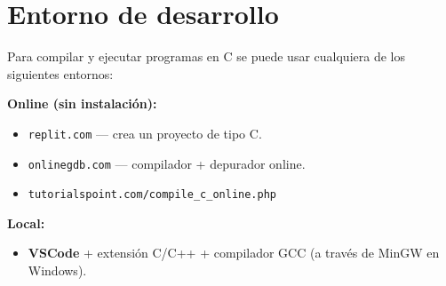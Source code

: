 \section{Entorno de desarrollo}

Para compilar y ejecutar programas en C se puede usar cualquiera de los siguientes entornos:

\textbf{Online (sin instalación):}
\begin{itemize}
    \item \texttt{replit.com} --- crea un proyecto de tipo C.
    \item \texttt{onlinegdb.com} --- compilador + depurador online.
    \item \texttt{tutorialspoint.com/compile\_c\_online.php}
\end{itemize}

\textbf{Local:}
\begin{itemize}
    \item \textbf{VSCode} + extensión C/C++ + compilador GCC (a través de MinGW en Windows).
\end{itemize}
